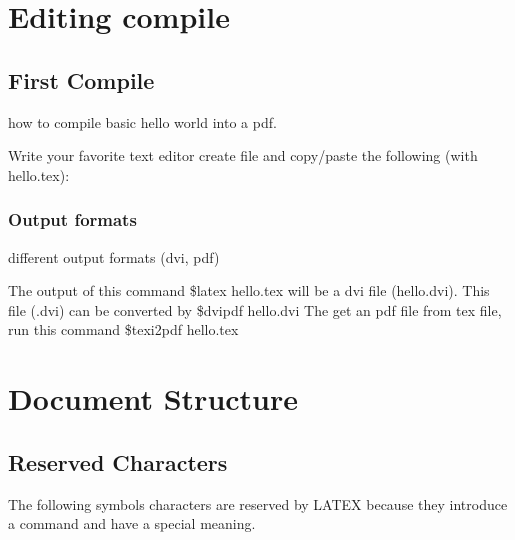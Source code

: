 \documentclass{report}
\begin{document}
\tableofcontents{}

\chapter{Editing compile}

\section{First Compile}

how to compile basic hello world into a pdf.

Write your favorite text editor create file and copy/paste the following (with hello.tex):

\subsection{Output formats}

different output formats (dvi, pdf)

The output of this command \$latex hello.tex will be a dvi 
file (hello.dvi). This file (.dvi) can be converted by \$dvipdf 
hello.dvi The get an pdf file from tex file, run this 
command \$texi2pdf hello.tex

\chapter{Document Structure}

\section{Reserved Characters}

The following symbols characters are reserved by LATEX because 
they introduce a command and have a special meaning.
\end{document}

